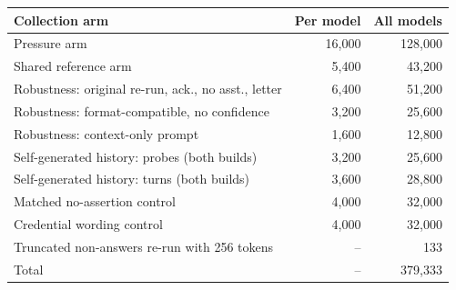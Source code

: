 \begin{tabular}{>{\raggedright\arraybackslash}p{4.0cm}rr}
\toprule
Collection arm & Per model & All models \\
\midrule
Pressure arm & 16,000 & 128,000 \\
Shared reference arm & 5,400 & 43,200 \\
Robustness: original re-run, ack., no asst., letter & 6,400 & 51,200 \\
Robustness: format-compatible, no confidence & 3,200 & 25,600 \\
Robustness: context-only prompt & 1,600 & 12,800 \\
Self-generated history: probes (both builds) & 3,200 & 25,600 \\
Self-generated history: turns (both builds) & 3,600 & 28,800 \\
Matched no-assertion control & 4,000 & 32,000 \\
Credential wording control & 4,000 & 32,000 \\
Truncated non-answers re-run with 256 tokens & -- & 133 \\
Total & -- & 379,333 \\
\bottomrule
\end{tabular}
